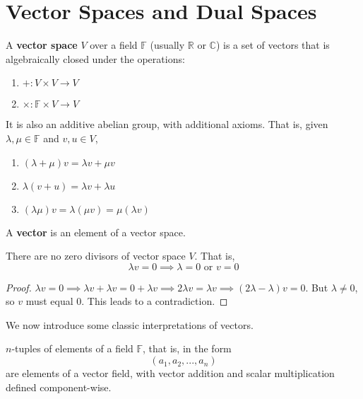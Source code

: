 \section{Vector Spaces and Dual Spaces}

  \begin{definition}
    A \textbf{vector space} $V$ over a field $\mathbb{F}$ (usually $\mathbb{R}$ or $\mathbb{C}$) is a set of vectors that is algebraically closed under the operations: 
    \begin{enumerate}
      \item $+: V \times V \longrightarrow V$
      \item $\times: \mathbb{F} \times V \longrightarrow V$
    \end{enumerate}
    It is also an additive abelian group, with additional axioms. That is, given $\lambda, \mu \in \mathbb{F}$ and $v, u \in V$, 
    \begin{enumerate}
      \item $(\lambda + \mu) v = \lambda v + \mu v$
      \item $\lambda (v + u) = \lambda v + \lambda u$
      \item $(\lambda \mu) v = \lambda (\mu v) = \mu (\lambda v)$ 
    \end{enumerate}
  \end{definition} 

  \begin{definition}[Vector]
    A \textbf{vector} is an element of a vector space. 
  \end{definition}

  \begin{proposition}
    There are no zero divisors of vector space $V$. That is, 
    \begin{equation}
      \lambda v = 0 \implies \lambda = 0 \text{ or } v = 0
    \end{equation}
  \end{proposition}
  \begin{proof}
    $\lambda v = 0 \implies \lambda v + \lambda v = 0 + \lambda v \implies 2\lambda v = \lambda v \implies (2\lambda - \lambda ) v = 0$. But $\lambda \neq 0$, so $v$ must equal $0$. This leads to a contradiction. 
  \end{proof}

  We now introduce some classic interpretations of vectors. 

  \begin{example}
    $n$-tuples of elements of a field $\mathbb{F}$, that is, in the form
    \begin{equation}
      (a_1, a_2, ..., a_n)
    \end{equation}
    are elements of a vector field, with vector addition and scalar multiplication defined component-wise. 
  \end{example}

